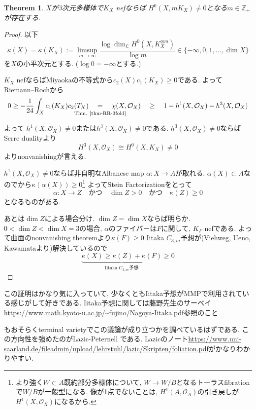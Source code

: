 \documentclass[dvipdfmx,a4paper,11pt]{article} %
\newtheorem{thm}{Theorem}[section]
\theoremstyle{definition}
\theoremstyle{remark}
\numberwithin{equation}{section}
\newcommand{\underalign}[2]{\quad \underset{\mathclap{\strut #1}}{#2}\quad}
\newcommand{\N}{\mathbb{Z}_+}
\newcommand{\C}{\mathbb{C}}
\begin{document}
\begin{thm}\cite{Miy87}\cite{Miy88a}
$X$が3次元多様体で$K_X$ nefならば
$H^0(X, mK_X) \neq 0$となる$m \in \N$が存在する. 
\end{thm}
\begin{proof}
以下
$$
\kappa(X)=\kappa(K_X)
:= \limsup_{ m \to \infty}\frac{\log \dim_\C H^0(X, K_X^{\otimes m})}{\log m} 
\in \{ - \infty, 0, 1, \ldots, \dim X\}
$$
を$X$の小平次元とする. ($\log 0=-\infty$とする.)


$K_X$ nefならばMiyaokaの不等式から$c_2(X)c_1(K_X)\ge 0$である. 
よってRiemann--Rochから
\[
0 \ge 
-\frac{1}{24}\int_X c_1(K_X)c_2(T_X)
\underalign{\text{Thm. \ref{thm-RR-3fold}}}{=}
\chi(X,\mathcal O_X)
\underalign{}{\ge}
1-h^1(X, \mathcal O_X) -h^3(X, \mathcal O_X) 
\]
よって
$h^1(X, \mathcal O_X)\neq0$または$h^3(X, \mathcal O_X)\neq0$である. 
$h^3(X, \mathcal O_X)\neq0$ならばSerre dualityより
$$
H^3(X, \mathcal O_X) \cong H^0(X, K_X) \neq0
$$
よりnonvanishingが言える. 

$h^1(X, \mathcal O_X)\neq0$ならば非自明なAlbanese map
$\alpha : X \to A$が取れる. 
$\alpha(X) \subset A$なので\cite[Theorem 10.9]{Uen75}から$\kappa(\alpha(X))\ge 0$\footnote{より強く$W \subset A$既約部分多様体について, $W \to W/B$となるトーラスfibrationで$W/B$が一般型になる. 像が1点でないことは, $H^1(A, \mathcal O_A)$の引き戻しが$H^1(X, \mathcal O_X)$になるから. }
よってStein Factorizationをとって
$$\alpha : X \to Z
\quad \text{かつ} \quad
\dim Z >0\quad \text{かつ} \quad
\kappa(Z) \ge 0
$$となるものがある. 

あとは$\dim Z$による場合分け. 
$\dim Z=\dim X$ならば明らか. 
$0 < \dim Z <  \dim X=3$の場合, $\alpha$のファイバーは$F$に関して, $K_F$ nefである. 
よって曲面のnonvanishing theoremより$\kappa(F)\ge 0$
Iitaka $C_{3, m}$予想が(Viehweg, Ueno, Kawamataより)解決しているので
$$
\underbrace{\kappa(X) \ge \kappa(Z) + \kappa(F)}_{\text{Iitaka $C_{3, m}$予想}}
 \ge 0
$$
\end{proof}
この証明はかなり気に入っていて, 少なくともIitaka予想がMMPで利用されている感じがして好きである. 
Iitaka予想に関しては藤野先生のサーベイ\url{https://www.math.kyoto-u.ac.jp/~fujino/Nagoya-Iitaka.pdf}参照のこと

\cite{Miy88a}もおそらくterminal varietyでこの議論が成り立つかを調べているはずである. 
この方向性を強めたのがLazic-Peternell \cite{LP18}である. 
Lazicのノート\url{https://www.uni-saarland.de/fileadmin/upload/lehrstuhl/lazic/Skripten/foliation.pdf}がかなりわかりやすい. 
\end{document}
